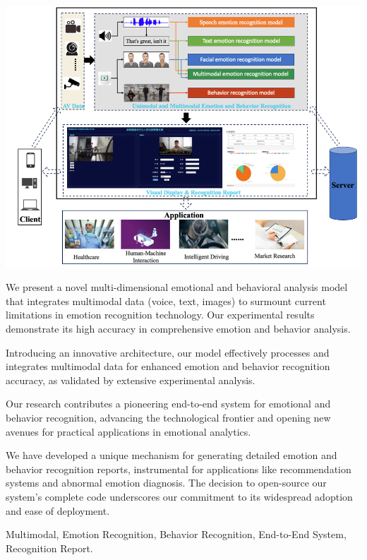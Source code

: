\documentclass[preprint,12pt]{elsarticle}
\begin{document}
\begin{frontmatter}
\begin{abstract}
\end{abstract}

\begin{graphicalabstract}

\centering
\includegraphics[width=1.1\textwidth]{Fig1.png}

\end{graphicalabstract}

\begin{highlights}
\item We present a novel multi-dimensional emotional and behavioral analysis model that integrates multimodal data (voice, text, images) to surmount current limitations in emotion recognition technology. Our experimental results demonstrate its high accuracy in comprehensive emotion and behavior analysis.
\item Introducing an innovative architecture, our model effectively processes and integrates multimodal data for enhanced emotion and behavior recognition accuracy, as validated by extensive experimental analysis.
\item Our research contributes a pioneering end-to-end system for emotional and behavior recognition, advancing the technological frontier and opening new avenues for practical applications in emotional analytics.
\item We have developed a unique mechanism for generating detailed emotion and behavior recognition reports, instrumental for applications like recommendation systems and abnormal emotion diagnosis. The decision to open-source our system's complete code underscores our commitment to its widespread adoption and ease of deployment.
\end{highlights}


\begin{keyword}
Multimodal, Emotion Recognition, Behavior Recognition, End-to-End System, Recognition Report.
\end{keyword}

\end{frontmatter}
\end{document}
